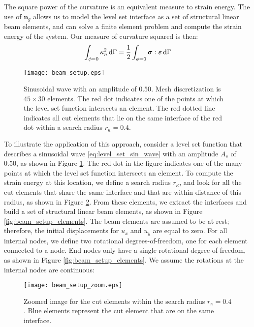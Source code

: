 The square power of the curvature is an equivalent measure to strain energy. The use of $\mathbf{n}_{g}$ allows us to model the level set interface as a set of structural linear beam elements, and can solve a finite element problem and compute the strain energy of the system. Our measure of curvature squared is then:
%
\begin{equation}
	\centering
	\label{eq:curvature_strain_energy}
	\int_{\phi=0} \kappa_{n}^{2} \,\mathrm{d}\Gamma = \frac{1}{2} \int_{\phi=0} \boldsymbol{\sigma} : \boldsymbol{\varepsilon} \,\mathrm{d}\Gamma
\end{equation}
%
\begin{figure}
	\centering
	\texttt{[image: beam\_setup.eps]}
	\caption{Sinusoidal wave with an amplitude of $0.50$. Mesh discretization is $45 \times 30$ elements. The red dot indicates one of the points at which the level set function intersects an element. The red dotted line indicates all cut elements that lie on the same interface of the red dot within a search radius $r_{\kappa} = 0.4$.}
	\label{fig:beam_setup}
\end{figure}
%
To illustrate the application of this approach, consider a level set function that describes a sinusoidal wave \ref{eq:level_set_sin_wave} with an amplitude $A_{s}$ of 0.50, as shown in Figure \ref{fig:beam_setup}. The red dot in the figure indicates one of the many points at which the level set function intersects an element. To compute the strain energy at this location, we define a search radius $r_{\kappa}$, and look for all the cut elements that share the same interface and that are within distance of this radius, as shown in Figure \ref{fig:beam_setup_zoom}. From these elements, we extract the interfaces and build a set of structural linear beam elements, as shown in Figure \ref{fig:beam_setup_elements}. The beam elements are assumed to be at rest; therefore, the initial displacements for $u_{x}$ and $u_{y}$ are equal to zero. For all internal nodes, we define two rotational degrees-of-freedom, one for each element connected to a node. End nodes only have a single rotational degree-of-freedom, as shown in Figure \ref{fig:beam_setup_elements}. We assume the rotations at the internal nodes are continuous:
%
\begin{figure}
	\centering
	\texttt{[image: beam\_setup\_zoom.eps]}
	\caption{Zoomed image for the cut elements within the search radius $r_{\kappa} = 0.4$. Blue elements represent the cut element that are on the same interface.}
	\label{fig:beam_setup_zoom}
\end{figure}
